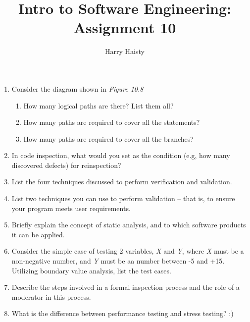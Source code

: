 \documentclass[11pt]{article}
\title{Intro to Software Engineering: Assignment 10}
\author{Harry Haisty}
\begin{document}
    \maketitle
    \begin{enumerate}
        \item Consider the diagram shown in \textit{Figure 10.8}
        \begin{enumerate}
        \item How many logical paths are there? List them all? 
        \item How many paths are required to cover all the statements?
        \item How many paths are required to cover all the branches?
        \end{enumerate}
        
        \item In code inspection, what would you set as the condition (e.g, how many discovered defects) for reinspection?
        
        \item List the four techniques discussed to perform verification and validation.
        
        \item List two techniques you can use to perform validation -- that is, to ensure your program meets user requirements. 
        
        \item Briefly explain the concept of static analysis, and to which software products it can be applied.
        
        \item Consider the simple case of testing 2 variables, \textit{X} and \textit{Y}, where \textit{X} must be a non-negative number, and \textit{Y} must be aa number between -5 and +15. Utilizing boundary value analysis, list the test cases. 
        
        \item Describe the steps involved in a formal inspection process and the role of a moderator in this process.
        
        \item What is the difference between performance testing and stress testing? :) 
        
        
    \end{enumerate}
    
    
\end{document}
